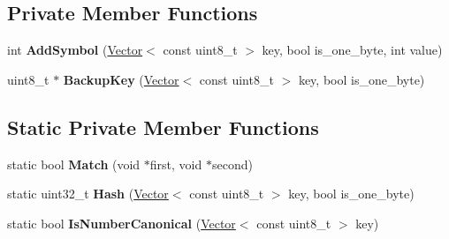 \subsection*{Private Member Functions}
\begin{DoxyCompactItemize}
\item 
int {\bfseries Add\+Symbol} (\hyperlink{classv8_1_1internal_1_1_vector}{Vector}$<$ const uint8\+\_\+t $>$ key, bool is\+\_\+one\+\_\+byte, int value)\hypertarget{classv8_1_1internal_1_1_duplicate_finder_a570450e38bb0175e9f9e7d0c4d183ce5}{}\label{classv8_1_1internal_1_1_duplicate_finder_a570450e38bb0175e9f9e7d0c4d183ce5}

\item 
uint8\+\_\+t $\ast$ {\bfseries Backup\+Key} (\hyperlink{classv8_1_1internal_1_1_vector}{Vector}$<$ const uint8\+\_\+t $>$ key, bool is\+\_\+one\+\_\+byte)\hypertarget{classv8_1_1internal_1_1_duplicate_finder_a7a868bd117727c0476d89dccf5bc7a3b}{}\label{classv8_1_1internal_1_1_duplicate_finder_a7a868bd117727c0476d89dccf5bc7a3b}

\end{DoxyCompactItemize}
\subsection*{Static Private Member Functions}
\begin{DoxyCompactItemize}
\item 
static bool {\bfseries Match} (void $\ast$first, void $\ast$second)\hypertarget{classv8_1_1internal_1_1_duplicate_finder_a60bb627143b7f0301f821cbaba48eb61}{}\label{classv8_1_1internal_1_1_duplicate_finder_a60bb627143b7f0301f821cbaba48eb61}

\item 
static uint32\+\_\+t {\bfseries Hash} (\hyperlink{classv8_1_1internal_1_1_vector}{Vector}$<$ const uint8\+\_\+t $>$ key, bool is\+\_\+one\+\_\+byte)\hypertarget{classv8_1_1internal_1_1_duplicate_finder_a78d865fb8968807c4a5c046899aafa99}{}\label{classv8_1_1internal_1_1_duplicate_finder_a78d865fb8968807c4a5c046899aafa99}

\item 
static bool {\bfseries Is\+Number\+Canonical} (\hyperlink{classv8_1_1internal_1_1_vector}{Vector}$<$ const uint8\+\_\+t $>$ key)\hypertarget{classv8_1_1internal_1_1_duplicate_finder_a860ef5930fc3f154faf39b2da8469255}{}\label{classv8_1_1internal_1_1_duplicate_finder_a860ef5930fc3f154faf39b2da8469255}

\end{DoxyCompactItemize}
